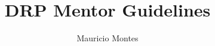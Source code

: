 \documentclass{article}
\begin{document}
\author{Mauricio Montes}
\title{DRP Mentor Guidelines}

\maketitle
\end{document}
